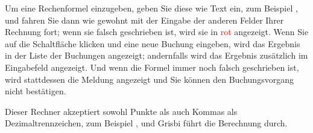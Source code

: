 Um eine Rechenformel einzugeben, geben Sie diese wie Text ein, zum Beispiel , und fahren Sie dann wie gewohnt mit der Eingabe der anderen Felder Ihrer Rechnung fort; wenn sie falsch geschrieben ist, wird sie in \textcolor{red}{rot} angezeigt. Wenn Sie auf die Schaltfläche  klicken und eine neue Buchung eingeben, wird das Ergebnis  in der Liste der Buchungen angezeigt; andernfalls wird das Ergebnis zusätzlich im Eingabefeld angezeigt. Und wenn die Formel immer noch falsch geschrieben ist, wird stattdessen die Meldung   angezeigt und Sie können den Buchungsvorgang nicht bestätigen.

Dieser Rechner akzeptiert sowohl Punkte als auch Kommas als Dezimaltrennzeichen, zum Beispiel , und Grisbi führt die Berechnung durch.


